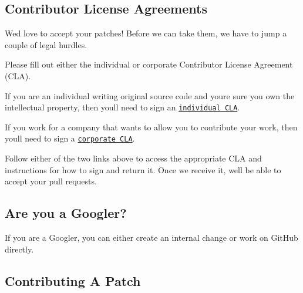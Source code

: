 \subsection*{Contributor License Agreements}

We\textquotesingle{}d love to accept your patches! Before we can take them, we have to jump a couple of legal hurdles.

Please fill out either the individual or corporate Contributor License Agreement (C\+LA).


\begin{DoxyItemize}
\item If you are an individual writing original source code and you\textquotesingle{}re sure you own the intellectual property, then you\textquotesingle{}ll need to sign an \href{https://developers.google.com/open-source/cla/individual}{\tt individual C\+LA}.
\item If you work for a company that wants to allow you to contribute your work, then you\textquotesingle{}ll need to sign a \href{https://developers.google.com/open-source/cla/corporate}{\tt corporate C\+LA}.
\end{DoxyItemize}

Follow either of the two links above to access the appropriate C\+LA and instructions for how to sign and return it. Once we receive it, we\textquotesingle{}ll be able to accept your pull requests.

\subsection*{Are you a Googler?}

If you are a Googler, you can either create an internal change or work on Git\+Hub directly.

\subsection*{Contributing A Patch}


